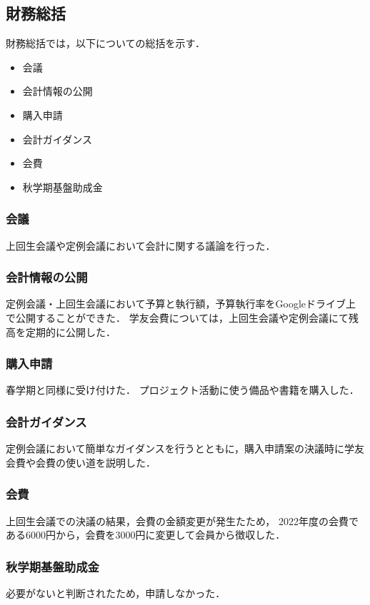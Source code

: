\subsection*{財務総括}


財務総括では，以下についての総括を示す．
\begin{itemize}
  \item 会議
  \item 会計情報の公開
  \item 購入申請
  \item 会計ガイダンス
  \item 会費
  \item 秋学期基盤助成金
\end{itemize}

\subsubsection*{会議}
上回生会議や定例会議において会計に関する議論を行った．

\subsubsection*{会計情報の公開}
定例会議・上回生会議において予算と執行額，予算執行率をGoogleドライブ上で公開することができた．
学友会費については，上回生会議や定例会議にて残高を定期的に公開した．

\subsubsection*{購入申請}
春学期と同様に受け付けた．
プロジェクト活動に使う備品や書籍を購入した．

\subsubsection*{会計ガイダンス}
定例会議において簡単なガイダンスを行うとともに，購入申請案の決議時に学友会費や会費の使い道を説明した．

\subsubsection*{会費}
上回生会議での決議の結果，会費の金額変更が発生たため，
2022年度の会費である6000円から，会費を3000円に変更して会員から徴収した．

\subsubsection*{秋学期基盤助成金}
必要がないと判断されたため，申請しなかった．

